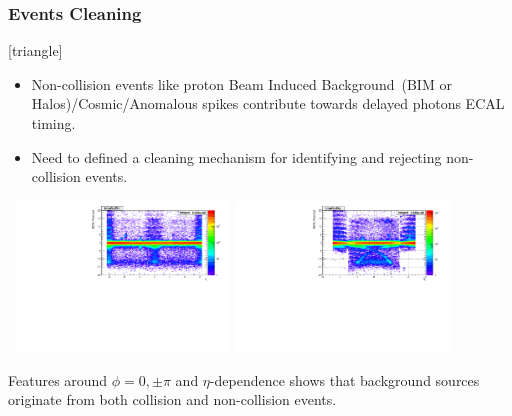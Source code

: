 \documentclass{beamer}
\begin{document}
\begin{frame}
\frametitle{Events Cleaning}
  \begin{minipage}[t]{\linewidth}
 [triangle]
  \begin{itemize}
  \item Non-collision events like proton Beam Induced Background~(BIM or     Halos)/Cosmic/Anomalous spikes contribute towards delayed photons ECAL timing. 
  \item Need to defined a cleaning mechanism for identifying and rejecting non-collision events.
  \end{itemize}
  \end{minipage}
  
  \begin{minipage}[t]{\linewidth}
 \mbox{
 \includegraphics[height=4cm,width=0.40\paperwidth]{THESISPLOTS/SinglePhotonDataSet-TimeVsPhi.pdf}
 \includegraphics[height=4cm,width=0.40\paperwidth]{THESISPLOTS/SinglePhotonDataSet-TimeVsEta.pdf}
 }
   \end{minipage}
\begin{minipage}[b]{\linewidth}
Features around $\phi = 0, \pm \pi$ and $\eta$-dependence shows that background sources originate from both collision and non-collision events.
\end{minipage} 
\end{frame}
\end{document}
